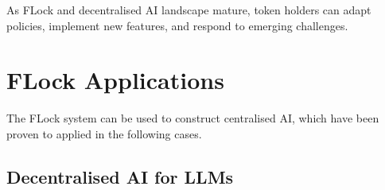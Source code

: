 \documentclass[conference]{IEEEtran}
\newcommand{\LLMs}{\acp{LLM}\xspace}
\begin{document}
As FLock and decentralised AI landscape mature, token holders can adapt policies, implement new features, and respond to emerging challenges.





\section{FLock Applications}

The FLock system can be used to construct centralised AI, which have been proven to applied in the following cases.

\subsection{Decentralised AI for \LLMs}
\end{document}

